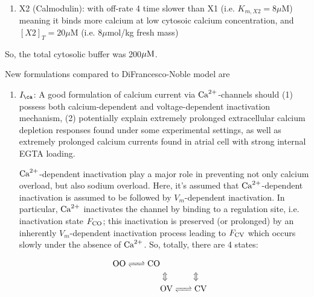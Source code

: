 \begin{enumerate}
\begin{enumerate}
  \item X2 (Calmodulin): with off-rate 4 time slower
  than X1 (i.e. $K_{m,X2}=8\mu$M) meaning it binds more calcium at low cytosoic
  calcium concentration, and $[X2]_T=20\mu$M (i.e. 8$\mu$mol/kg fresh mass)
  \end{enumerate}
  So, the total cytosolic buffer was 200${\mu\text{M}}$.
  
\end{enumerate}

New formulations compared to DiFrancesco-Noble model are
\begin{enumerate}
  \item $I_\ca$: A good formulation of calcium current via ${\text{Ca}^{2+}}$-channels should
  (1) possess both calcium-dependent and voltage-dependent inactivation
  mechanism, (2) potentially explain extremely prolonged extracellular calcium
  depletion responses found under some experimental settings, as well as
  extremely prolonged calcium currents found in atrial cell with strong internal EGTA loading.
  
  ${\text{Ca}^{2+}}$-dependent inactivation play a major role in preventing not only calcium
  overload, but also sodium overload. Here, it's assumed that ${\text{Ca}^{2+}}$-dependent
  inactivation is assumed to be followed by $V_m$-dependent inactivation.
  In particular, ${\text{Ca}^{2+}}$ inactivates the channel by binding to a regulation site,
  i.e. inactivation state $F_{\ce{CO}}$; this inactivation is preserved (or
  prolonged) by an inherently  $V_m$-dependent inactivation process leading to
  $F_{\ce{CV}}$ which occurs slowly  under the absence of ${\text{Ca}^{2+}}$.
  So, totally, there are 4 states:

  \begin{equation}
    \label{eq:1414}
    \begin{split}
      \ce{OO <=>  CO} \\
      &\Updownarrow \;\;\;\;\;\;\;\;\;\;\; \Updownarrow\\
      &\ce{OV <=> CV }
    \end{split}
  \end{equation}
  

\end{enumerate}
